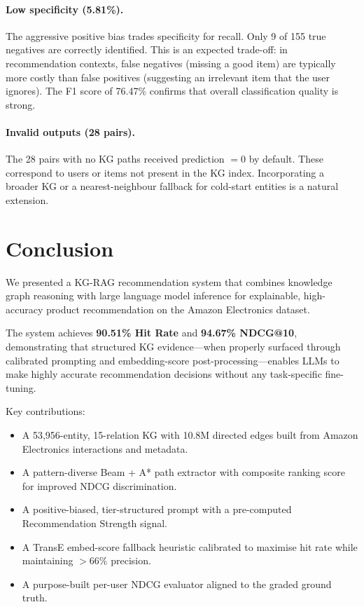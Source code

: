 \documentclass[12pt,a4paper]{article}
\begin{document}
\paragraph{Low specificity (5.81\%).}
The aggressive positive bias trades specificity for recall.
Only 9 of 155 true negatives are correctly identified.
This is an expected trade-off: in recommendation contexts, false negatives
(missing a good item) are typically more costly than false positives
(suggesting an irrelevant item that the user ignores).
The F1 score of 76.47\% confirms that overall classification quality is strong.

\paragraph{Invalid outputs (28 pairs).}
The 28 pairs with no KG paths received prediction $= 0$ by default.
These correspond to users or items not present in the KG index.
Incorporating a broader KG or a nearest-neighbour fallback for cold-start
entities is a natural extension.

\section{Conclusion}

We presented a KG-RAG recommendation system that combines knowledge graph
reasoning with large language model inference for explainable, high-accuracy
product recommendation on the Amazon Electronics dataset.

The system achieves \textbf{90.51\% Hit Rate} and \textbf{94.67\% NDCG@10},
demonstrating that structured KG evidence---when properly surfaced through
calibrated prompting and embedding-score post-processing---enables LLMs to
make highly accurate recommendation decisions without any task-specific
fine-tuning.

Key contributions:
\begin{itemize}[leftmargin=2em]
  \item A 53,956-entity, 15-relation KG with 10.8M directed edges built from
        Amazon Electronics interactions and metadata.
  \item A pattern-diverse Beam + A* path extractor with composite ranking score
        for improved NDCG discrimination.
  \item A positive-biased, tier-structured prompt with a pre-computed
        Recommendation Strength signal.
  \item A TransE embed-score fallback heuristic calibrated to maximise
        hit rate while maintaining $>$66\% precision.
  \item A purpose-built per-user NDCG evaluator aligned to the graded ground truth.
\end{itemize}
\end{document}
